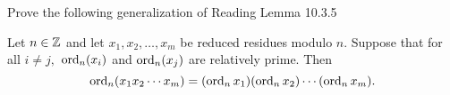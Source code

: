 \documentclass[handout]{ximera}
\begin{document}
\begin{br}
    Prove the following generalization of Reading Lemma 10.3.5
    
    
    \begin{lemma}
        Let $n\in\mathbb Z$ and let $x_1,x_2,\dots,x_m$ be reduced residues modulo $n$.  Suppose that for all $i\neq j,$ $\operatorname{ord}_n(x_i)$ and $\operatorname{ord}_n(x_j)$ are relatively prime. Then \[\operatorname{ord}_n(x_1 x_2\cdots x_m)=(\operatorname{ord}_n x_1)(\operatorname{ord}_n x_2)\cdots (\operatorname{ord}_n x_m).\]
    \end{lemma}
    \pdfOnly{\ifhandout
        \vfill
        \else\fi}
\end{br}
\end{document}
